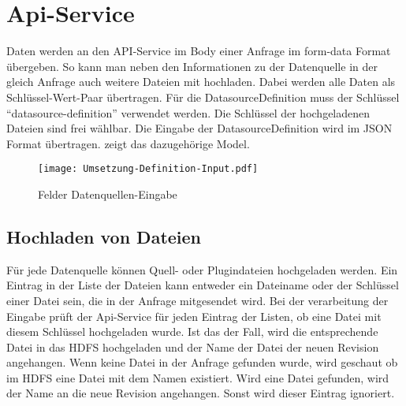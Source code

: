 \section{Api-Service}

Daten werden an den API-Service im Body einer Anfrage im form-data Format übergeben.
So kann man neben den Informationen zu der Datenquelle in der gleich Anfrage auch weitere Dateien mit hochladen.
Dabei werden alle Daten als Schlüssel-Wert-Paar übertragen.
Für die DatasourceDefinition muss der Schlüssel "`datasource-definition"' verwendet werden.
Die Schlüssel der hochgeladenen Dateien sind frei wählbar.
Die Eingabe der DatasourceDefinition wird im JSON Format übertragen.
 zeigt das dazugehörige Model.

\begin{figure}
    \centering
    \texttt{[image: Umsetzung-Definition-Input.pdf]}
    \caption{Felder Datenquellen-Eingabe}
    \label{fig:datasource-definition-input}
\end{figure}

\subsection{Hochladen von Dateien}

Für jede Datenquelle können Quell- oder Plugindateien hochgeladen werden.
Ein Eintrag in der Liste der Dateien kann entweder ein Dateiname oder der Schlüssel einer Datei sein, die in der Anfrage mitgesendet wird.
Bei der verarbeitung der Eingabe prüft der Api-Service für jeden Eintrag der Listen, ob eine Datei mit diesem Schlüssel hochgeladen wurde.
Ist das der Fall, wird die entsprechende Datei in das HDFS hochgeladen und der Name der Datei der neuen Revision angehangen.
Wenn keine Datei in der Anfrage gefunden wurde, wird geschaut ob im HDFS eine Datei mit dem Namen existiert.
Wird eine Datei gefunden, wird der Name an die neue Revision angehangen.
Sonst wird dieser Eintrag ignoriert.

